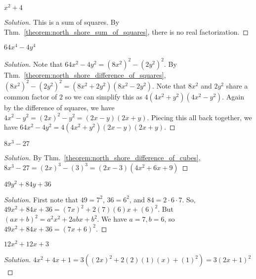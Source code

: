 \documentclass[crop=false,class=book,oneside]{standalone}
\begin{document}
            \begin{problem}
            $x^{2}+4$
            \end{problem}
            \begin{proof}[Solution]
            This is a sum of squares. By Thm.~\ref{theorem:north_shore_sum_of_squares}, there is no real factorization.
            \end{proof}
            \begin{problem}
            $64x^{4}-4y^{4}$
            \end{problem}
            \begin{proof}[Solution]
            Note that $64x^{2}-4y^{2}=(8x^{2})^{2}-(2y^{2})^{2}$. By Thm.~\ref{theorem:north_shore_difference_of_squares}, $(8x^{2})^{2}-(2y^{2})^{2}=(8x^{2}+2y^{2})(8x^{2}-2y^{2})$. Note that $8x^{2}$ and $2y^{2}$ share a common factor of $2$ so we can simplify this as $4(4x^{2}+y^{2})(4x^{2}-y^{2})$. Again by the difference of squares, we have $4x^{2}-y^{2}=(2x)^{2}-y^{2}=(2x-y)(2x+y)$. Piecing this all back together, we have $64x^{2}-4y^{2}=4(4x^{2}+y^{2})(2x-y)(2x+y)$.
            \end{proof}
            \begin{problem}
            $8x^{3}-27$
            \end{problem}
            \begin{proof}[Solution]
            By Thm.~\ref{theorem:north_shore_difference_of_cubes}, $8x^{3}-27=(2x)^{3}-(3)^{3}=(2x-3)(4x^{2}+6x+9)$
            \end{proof}
            \begin{problem}
            $49y^{2}+84y+36$
            \end{problem}
            \begin{proof}[Solution]
            First note that $49=7^{2}$, $36=6^{2}$, and $84=2\cdot 6\cdot 7$. So, $49x^{2}+84x+36=(7x)^{2}+2(7)(6)x+(6)^{2}$. But $(ax+b)^{2}=a^{2}x^{2}+2abx+b^{2}$. We have $a=7,b=6$, so $49x^{2}+84x+36=(7x+6)^{2}$.
            \end{proof}
            \begin{problem}
            $12x^{2}+12x+3$
            \end{problem}
            \begin{proof}[Solution]
            $4x^{2}+4x+1=3((2x)^{2}+2(2)(1)(x)+(1)^{2})=3(2x+1)^{2}$
            \end{proof}
\end{document}
